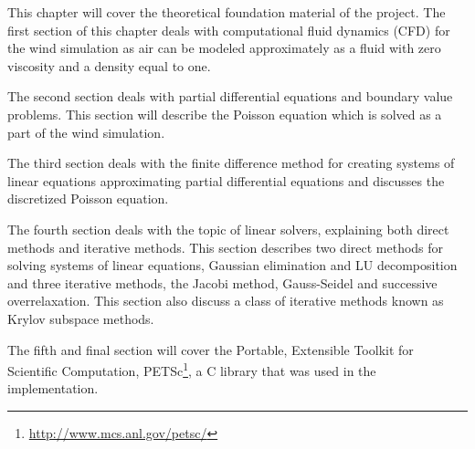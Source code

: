 This chapter will cover the theoretical foundation material of the project. 
The first section of this chapter deals with computational fluid dynamics (CFD) 
for the wind simulation as air can be modeled approximately as a fluid with 
zero viscosity and a density equal to one\cite{originalSnowThesis}.

The second section deals with partial differential equations and boundary value
problems. This section will describe the Poisson equation which is solved as a 
part of the wind simulation.

The third section deals with the finite difference method for creating systems of
linear equations approximating partial differential equations and discusses
the discretized Poisson equation.

The fourth section deals with the topic of linear solvers, explaining both direct
methods and iterative methods. This section describes two direct
methods for solving systems of linear equations, Gaussian elimination and LU
decomposition and three iterative methods, the Jacobi method, Gauss-Seidel and
successive overrelaxation. This section also discuss a class of iterative methods 
known as Krylov subspace methods. 

The fifth and final section will cover the Portable, Extensible Toolkit for
Scientific Computation, PETSc\footnote{\url{http://www.mcs.anl.gov/petsc/}}, a C 
library that was used in the implementation.
